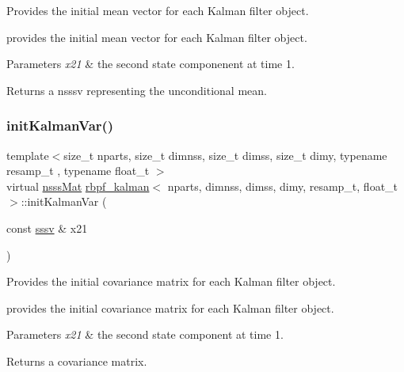 Provides the initial mean vector for each Kalman filter object. 

provides the initial mean vector for each Kalman filter object. 
\begin{DoxyParams}{Parameters}
{\em x21} & the second state componenent at time 1. \\
\hline
\end{DoxyParams}
\begin{DoxyReturn}{Returns}
a nsssv representing the unconditional mean. 
\end{DoxyReturn}
\mbox{\label{classrbpf__kalman_ac74007e577ea168e89da9e04cefc8c65}} 
\subsubsection{\texorpdfstring{init\+Kalman\+Var()}{initKalmanVar()}}
{\footnotesize\ttfamily template$<$size\+\_\+t nparts, size\+\_\+t dimnss, size\+\_\+t dimss, size\+\_\+t dimy, typename resamp\+\_\+t , typename float\+\_\+t $>$ \\
virtual \hyperlink{classrbpf__kalman_afb337a9e8f4048c0eae2971ea61f96d5}{nsss\+Mat} \hyperlink{classrbpf__kalman}{rbpf\+\_\+kalman}$<$ nparts, dimnss, dimss, dimy, resamp\+\_\+t, float\+\_\+t $>$\+::init\+Kalman\+Var (\begin{DoxyParamCaption}\item[{const \hyperlink{classrbpf__kalman_a616e56c08c1a6b476e065b2200433915}{sssv} \&}]{x21 }\end{DoxyParamCaption})\hspace{0.3cm}{\ttfamily [pure virtual]}}



Provides the initial covariance matrix for each Kalman filter object. 

provides the initial covariance matrix for each Kalman filter object. 
\begin{DoxyParams}{Parameters}
{\em x21} & the second state component at time 1. \\
\hline
\end{DoxyParams}
\begin{DoxyReturn}{Returns}
a covariance matrix. 
\end{DoxyReturn}
\mbox{\label{classrbpf__kalman_ab14d5ef38a664067a2eaec1b3ada1abc}} 
